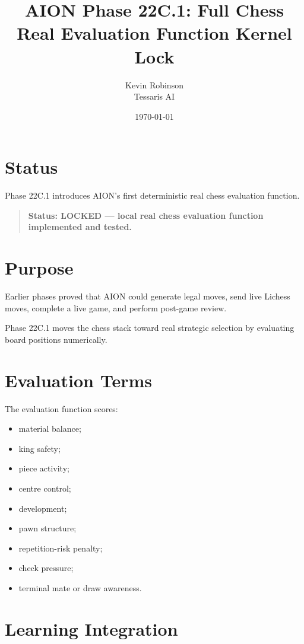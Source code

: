 \documentclass[11pt,a4paper]{article}
\title{\textbf{AION Phase 22C.1: Full Chess Real Evaluation Function Kernel Lock}}
\author{Kevin Robinson\\Tessaris AI}
\date{\today}
\begin{document}
\maketitle

\section{Status}

Phase 22C.1 introduces AION's first deterministic real chess evaluation function.

\begin{quote}
\textbf{Status: LOCKED --- local real chess evaluation function implemented and tested.}
\end{quote}

\section{Purpose}

Earlier phases proved that AION could generate legal moves, send live Lichess moves, complete a live game, and perform post-game review.

Phase 22C.1 moves the chess stack toward real strategic selection by evaluating board positions numerically.

\section{Evaluation Terms}

The evaluation function scores:

\begin{itemize}
  \item material balance;
  \item king safety;
  \item piece activity;
  \item centre control;
  \item development;
  \item pawn structure;
  \item repetition-risk penalty;
  \item check pressure;
  \item terminal mate or draw awareness.
\end{itemize}

\section{Learning Integration}
\end{document}
